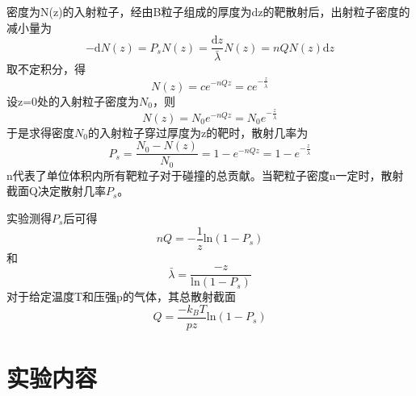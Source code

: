 \documentclass[a4paper]{article}
\begin{document}
密度为N(z)的入射粒子，经由B粒子组成的厚度为dz的靶散射后，出射粒子密度的减小量为
\begin{equation*}
-\text{d}N(z) = P_sN(z) = \frac{\text{d}z}{\bar{\lambda}}N(z) = nQN(z)\text{d}z
\end{equation*}
取不定积分，得
\begin{equation*}
N(z) = ce^{-nQz} = ce^{-\frac{z}{\bar{\lambda}}}
\end{equation*}
设z=0处的入射粒子密度为$N_0$，则
\begin{equation*}
N(z) = N_0e^{-nQz} = N_0e^{-\frac{z}{\bar{\lambda}}}
\end{equation*}
于是求得密度$N_0$的入射粒子穿过厚度为z的靶时，散射几率为
\begin{equation}
P_s = \frac{N_0 - N(z)}{N_0} = 1 - e^{-nQz} = 1 - e^{-\frac{z}{\bar{\lambda}}}\label{eq10}
\end{equation}
n代表了单位体积内所有靶粒子对于碰撞的总贡献。当靶粒子密度n一定时，散射截面Q决定散射几率$P_s$。

实验测得$P_s$后可得
\begin{equation}
nQ = -\frac{1}{z}\text{ln}(1-P_s)\label{eq11}
\end{equation}
和
\begin{equation}
\bar{\lambda} = \frac{-z}{\text{ln}(1-P_s)}\label{eq12}
\end{equation}
对于给定温度T和压强p的气体，其总散射截面
\begin{equation}
Q = \frac{-k_BT}{pz}\text{ln}(1-P_s)\label{eq13}
\end{equation}
\section{实验内容}
\end{document}
